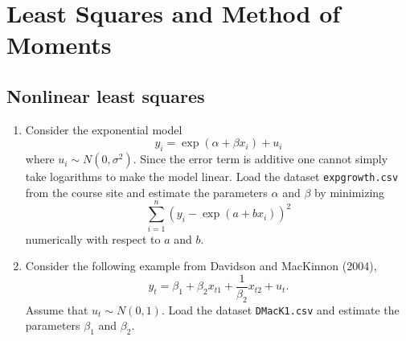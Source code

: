 \documentclass{article}
\begin{document}
\newpage
\section{Least Squares and Method of Moments\label{lsandmm}}

\subsection{Nonlinear least squares\label{nls1}}

\begin{enumerate}
\item Consider the exponential model%
\begin{equation*}
y_{i}=\exp \left( \alpha +\beta x_{i}\right) +u_{i}
\end{equation*}%
where $u_{i}\sim N(0,\sigma ^{2})$. Since the error term is additive one
cannot simply take logarithms to make the model linear. Load the dataset
\texttt{expgrowth.csv} from the course site and estimate the parameters $%
\alpha $ and $\beta $ by minimizing%
\begin{equation*}
\sum_{i=1}^{n}\left( y_{i}-\exp \left( a+bx_{i}\right) \right) ^{2}
\end{equation*}%
numerically with respect to $a$ and $b$.

\item Consider the following example from Davidson and MacKinnon (2004),%
\begin{equation*}
y_{t}=\beta _{1}+\beta _{2}x_{t1}+\frac{1}{\beta _{2}}x_{t2}+u_{t}.
\end{equation*}%
Assume that $u_{t}\sim N(0,1)$. Load the dataset \texttt{DMacK1.csv} and
estimate the parameters $\beta _{1}$ and $\beta _{2}$.
\end{enumerate}
\end{document}
